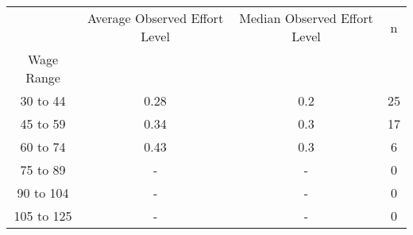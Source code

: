 \begin{tabular}{cccc}
\toprule
{} & Average Observed Effort Level & Median Observed Effort Level &   n \\
Wage Range &                               &                              &     \\
\midrule
30 to 44   &                          0.28 &                          0.2 &  25 \\
45 to 59   &                          0.34 &                          0.3 &  17 \\
60 to 74   &                          0.43 &                          0.3 &   6 \\
75 to 89   &                             - &                            - &   0 \\
90 to 104  &                             - &                            - &   0 \\
105 to 125 &                             - &                            - &   0 \\
\bottomrule
\end{tabular}

